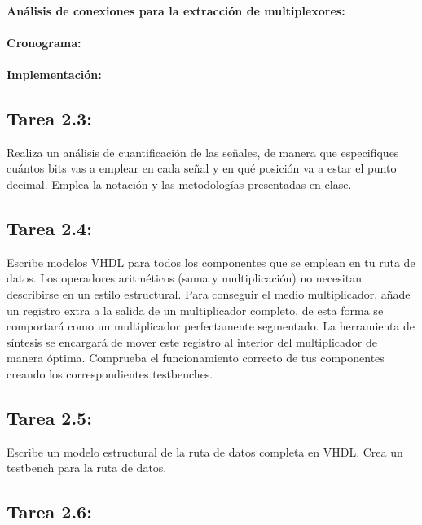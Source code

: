 \documentclass{article}
\begin{document}
\paragraph{Análisis de conexiones para la extracción de multiplexores:}


\paragraph{Cronograma:}

\paragraph{Implementación:}

\subsection{Tarea 2.3:}

Realiza un análisis de cuantificación de las señales, de manera que especifiques cuántos bits vas a emplear en cada señal y en qué posición va a estar el punto decimal. Emplea la notación y las metodologías presentadas en clase.

\subsection{Tarea 2.4:}

Escribe modelos VHDL para todos los componentes que se emplean en tu ruta de datos. Los operadores aritméticos (suma y multiplicación) no necesitan describirse en un estilo estructural. Para conseguir el medio multiplicador, añade un registro extra a la salida de un multiplicador completo, de esta forma se comportará como un multiplicador perfectamente segmentado. La herramienta de síntesis se encargará de mover este registro al interior del multiplicador de manera óptima. Comprueba el funcionamiento correcto de tus componentes creando los correspondientes testbenches.

\subsection{Tarea 2.5:}
Escribe un modelo estructural de la ruta de datos completa en VHDL. Crea un testbench para la ruta de datos.

\subsection{Tarea 2.6:}
\end{document}
